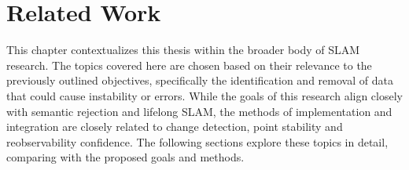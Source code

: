 \section{Related Work}
\label{sec:related_work}

This chapter contextualizes this thesis within the broader body of SLAM research. The topics covered here are chosen based on their relevance to the previously outlined objectives, specifically the identification and removal of data that could cause instability or errors. While the goals of this research align closely with semantic rejection and lifelong SLAM, the methods of implementation and integration are closely related to change detection, point stability and reobservability confidence. The following sections explore these topics in detail, comparing with the proposed goals and methods.

% 